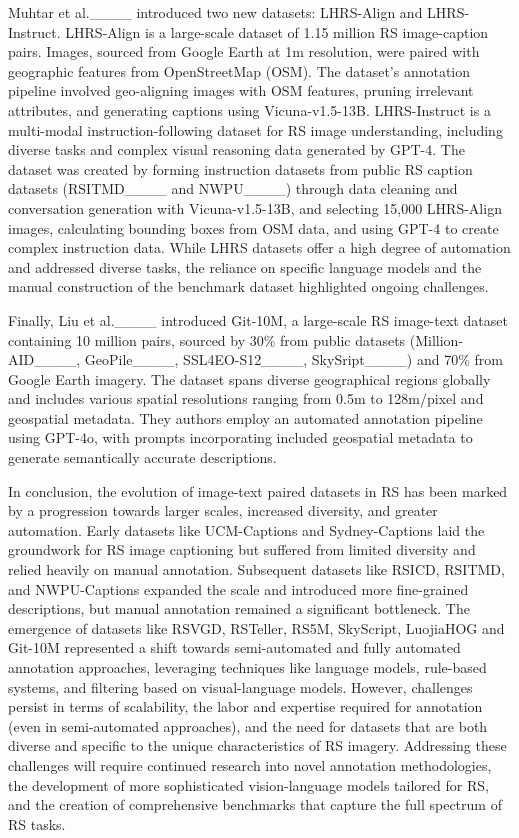 Muhtar et al.____ introduced two new datasets: LHRS-Align and LHRS-Instruct. LHRS-Align is a large-scale dataset of 1.15 million RS image-caption pairs. Images, sourced from Google Earth at 1m resolution, were paired with geographic features from OpenStreetMap (OSM). The dataset's annotation pipeline involved geo-aligning images with OSM features, pruning irrelevant attributes, and generating captions using Vicuna-v1.5-13B. LHRS-Instruct is a multi-modal instruction-following dataset for RS image understanding, including diverse tasks and complex visual reasoning data generated by GPT-4. The dataset was created by forming instruction datasets from public RS caption datasets (RSITMD____ and NWPU____) through data cleaning and conversation generation with Vicuna-v1.5-13B, and selecting 15,000 LHRS-Align images, calculating bounding boxes from OSM data, and using GPT-4 to create complex instruction data. While LHRS datasets offer a high degree of automation and addressed diverse tasks, the reliance on specific language models and the manual construction of the benchmark dataset highlighted ongoing challenges.

Finally, Liu et al.____ introduced Git-10M, a large-scale RS image-text dataset containing 10 million pairs, sourced by 30\% from public datasets (Million-AID____, GeoPile____, SSL4EO-S12____, SkySript____) and 70\% from Google Earth imagery. The dataset spans diverse geographical regions globally and includes various spatial resolutions ranging from 0.5m to 128m/pixel and geospatial metadata. They authors employ an automated annotation pipeline using GPT-4o, with prompts incorporating included geospatial metadata to generate semantically accurate descriptions.

In conclusion, the evolution of image-text paired datasets in RS has been marked by a progression towards larger scales, increased diversity, and greater automation. Early datasets like UCM-Captions and Sydney-Captions laid the groundwork for RS image captioning but suffered from limited diversity and relied heavily on manual annotation. Subsequent datasets like RSICD, RSITMD, and NWPU-Captions expanded the scale and introduced more fine-grained descriptions, but manual annotation remained a significant bottleneck. The emergence of datasets like RSVGD, RSTeller, RS5M, SkyScript, LuojiaHOG and Git-10M represented a shift towards semi-automated and fully automated annotation approaches, leveraging techniques like language models, rule-based systems, and filtering based on visual-language models. However, challenges persist in terms of scalability, the labor and expertise required for annotation (even in semi-automated approaches), and the need for datasets that are both diverse and specific to the unique characteristics of RS imagery. Addressing these challenges will require continued research into novel annotation methodologies, the development of more sophisticated vision-language models tailored for RS, and the creation of comprehensive benchmarks that capture the full spectrum of RS tasks.



